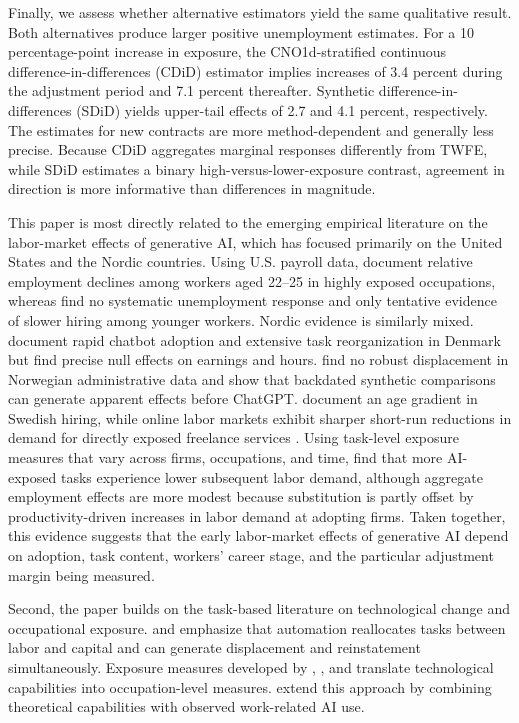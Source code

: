\documentclass[11pt]{article}
\begin{document}
Finally, we assess whether alternative estimators yield the same qualitative result. Both alternatives produce larger positive unemployment estimates. For a 10 percentage-point increase in exposure, the CNO1d-stratified continuous difference-in-differences (CDiD) estimator implies increases of 3.4 percent during the adjustment period and 7.1 percent thereafter. Synthetic difference-in-differences (SDiD) yields upper-tail effects of 2.7 and 4.1 percent, respectively. The estimates for new contracts are more method-dependent and generally less precise. Because CDiD aggregates marginal responses differently from TWFE, while SDiD estimates a binary high-versus-lower-exposure contrast, agreement in direction is more informative than differences in magnitude.

This paper is most directly related to the emerging empirical literature on the labor-market effects of generative AI, which has focused primarily on the United States and the Nordic countries. Using U.S. payroll data, \citet{brynjolfsson_chandar_chen_2025} document relative employment declines among workers aged 22--25 in highly exposed occupations, whereas \citet{massenkoff_mccrory_2026} find no systematic unemployment response and only tentative evidence of slower hiring among younger workers. Nordic evidence is similarly mixed. \citet{humlum_vestergaard_2025} document rapid chatbot adoption and extensive task reorganization in Denmark but find precise null effects on earnings and hours. \citet{facius_iacono_2026} find no robust displacement in Norwegian administrative data and show that backdated synthetic comparisons can generate apparent effects before ChatGPT. \citet{lodefalk_et_al_2026} document an age gradient in Swedish hiring, while online labor markets exhibit sharper short-run reductions in demand for directly exposed freelance services \citep{hui_reshef_zhou_2024}. Using task-level exposure measures that vary across firms, occupations, and time, \citet{hampole_et_al_2025} find that more AI-exposed tasks experience lower subsequent labor demand, although aggregate employment effects are more modest because substitution is partly offset by productivity-driven increases in labor demand at adopting firms. Taken together, this evidence suggests that the early labor-market effects of generative AI depend on adoption, task content, workers' career stage, and the particular adjustment margin being measured.


Second, the paper builds on the task-based literature on technological change and occupational exposure. \citet{autor_levy_murnane_2003} and \citet{acemoglu_restrepo_2019} emphasize that automation reallocates tasks between labor and capital and can generate displacement and reinstatement simultaneously. Exposure measures developed by \citet{felten_raj_seamans_2021}, \citet{felten_raj_seamans_2023}, and \citet{eloundou_manning_mishkin_rock_2024} translate technological capabilities into occupation-level measures. \citet{massenkoff_mccrory_2026} extend this approach by combining theoretical capabilities with observed work-related AI use.
\end{document}
